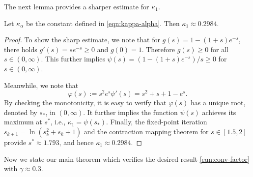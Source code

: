 The next lemma provides a sharper estimate for $\kappa_1$.

\begin{lemma}\label{lem:exp-1}
Let $\kappa_\alpha$ be the constant defined in \eqref{eqn:kappa-alpha}. Then $\kappa_1\approx 0.2984$.
\end{lemma}

\begin{proof}
To show the sharp estimate, we note that for $g(s) = 1-(1+s)e^{- s}$, there holds
$g'(s) = se^{-s} \ge 0$ and $g(0) = 1$. Therefore $g(s)\ge0$ for all $s\in(0,\infty)$.
This further implies $\psi(s)=(1-(1+s)e^{- s})/s \ge 0$ for $s\in (0,\infty)$.

Meanwhile, we note that
$$\varphi(s) := s^2 e^s \psi'(s) =  s^2 +s+1 -e^s. $$
{By checking the monotonicity, it is easy to verify that $\varphi(s)$ has a unique root, denoted by $s_*$, in $(0,\infty)$.
It further implies the function $\psi(s)$ achieves its maximum at $s^*$, i.e., $\kappa_1 = \psi(s_*)$.
Finally, the fixed-point iteration $s_{k+1} = \ln(s_k^2+s_k+1)$ and the contraction mapping theorem for $s\in[1.5,2]$ provide $s^*\approx1.793$, and hence $\kappa_1\approx 0.2984$.}
\end{proof}



Now we state our main theorem which verifies the desired result \eqref{eqn:conv-factor} with $\gamma\approx 0.3$.








